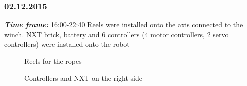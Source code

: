 \subsubsection{02.12.2015}
\textit{\textbf{Time frame:}} 16:00-22:40 \newline
Reels were installed onto the axis connected to the winch.
NXT brick, battery and 6 controllers (4 motor controllers, 2 servo controllers) were installed onto the robot

\begin{figure}[H]
	\begin{minipage}[h]{0.31\linewidth}
		\caption{Reels for the ropes}
	\end{minipage}
	\hfill
	\begin{minipage}[h]{0.31\linewidth}
		\caption{Controllers and NXT on the right side}

\end{minipage}
\end{figure}
